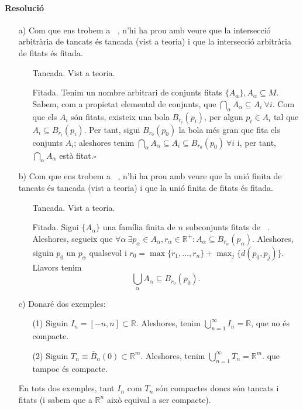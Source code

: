 \documentclass[11pt]{article}
\DeclareMathOperator{\Rn}{\mathbb{R}^n}
\DeclareMathOperator{\maxi}{max}
\begin{document}
\paragraph{Resolució}
\begin{itemize}
	\item[a)] Com que ens trobem a $\Rn$, n'hi ha prou amb veure que la intersecció arbitrària de tancats és tancada (vist a teoria) i que la intersecció arbitrària de fitats és fitada.
	\begin{itemize}
		\item[Tancada.] Vist a teoria.
		\item[Fitada.] Tenim un nombre arbitrari de conjunts fitats $\{A_{\alpha}\},A_{\alpha}\subseteq M$. Sabem, com a propietat elemental de conjunts, que $\bigcap_{\alpha}A_{\alpha}\subseteq A_i\ \forall i.$ Com que els $A_i$ són fitats, existeix una bola $B_{r_i}(p_i)$, per algun $p_i\in A_i$ tal que $A_i\subseteq B_{r_i}(p_i)$. Per tant, sigui $B_{r_0}(p_0)$ la bola més gran que fita els conjunts $A_i$; aleshores tenim $\bigcap_{\alpha}A_{\alpha}\subseteq A_i\subseteq B_{r_0}(p_0)\ \forall i$ i, per tant, $\bigcap_{\alpha}A_{\alpha}$ està fitat.$\square$
	\end{itemize}
	\item[b)] Com que ens trobem a $\Rn$, n'hi ha prou amb veure que la unió finita de tancats és tancada (vist a teoria) i que la unió finita de fitats és fitada.
	\begin{itemize}
		\item[Tancada.] Vist a teoria.
		\item[Fitada.] Sigui $\{A_{\alpha}\}$ una família finita de $n$ subconjunts fitats de $\Rn$. Aleshores, segueix que $\forall\alpha\ \exists p_{\alpha}\in A_{\alpha},r_{\alpha}\in\mathbb{R}^+:A_{\alpha}\subseteq B_{r_{\alpha}}(p_{\alpha})$. Aleshores, siguin $p_0$ un $p_{\alpha}$ qualsevol i $r_0=\maxi\{r_1,\ldots,r_n\}+\maxi_j\{d(p_0,p_j)\}$. Llavors tenim
		$$
		\bigcup_{\alpha}A_{\alpha}\subseteq B_{r_0}(p_0).
		$$
	\end{itemize}
	\item[c)] Donaré dos exemples:
	\begin{itemize}
		\item[(1)] Siguin $I_n=[-n,n]\subset\mathbb{R}$. Aleshores, tenim $\bigcup_{n=1}^{\infty}I_n=\mathbb{R}$, que no és compacte.
		\item[(2)] Siguin $T_n\equiv\bar{B}_n(0)\subset\mathbb{R}^m$. Aleshores, tenim $\bigcup_{n=1}^{\infty}T_n=\mathbb{R}^m$. que tampoc és compacte.
	\end{itemize}
	En tots dos exemples, tant $I_n$ com $T_n$ són compactes doncs són tancats i fitats (i sabem que a $\mathbb{R}^n$ això equival a ser compacte).
\end{itemize}
\end{document}
